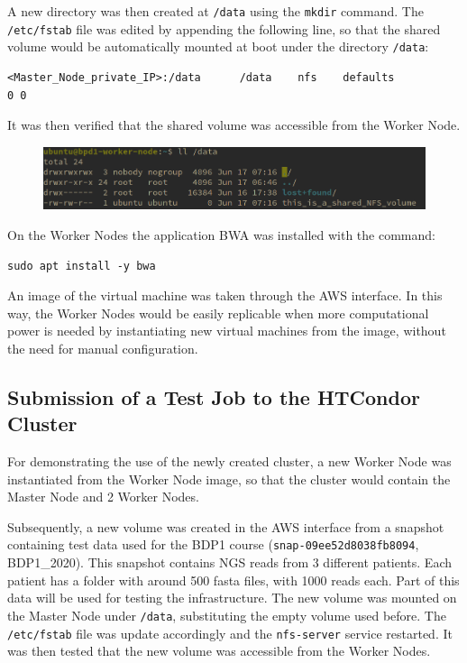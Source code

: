 \documentclass{article}
\begin{document}
A new directory was then created at \texttt{/data} using the \texttt{mkdir} command.
The \texttt{/etc/fstab} file was edited by appending the following line, so that the shared volume would be automatically mounted at boot under the directory \texttt{/data}:

\begin{lstlisting}
<Master_Node_private_IP>:/data      /data    nfs    defaults                0 0
\end{lstlisting}

It was then verified that the shared volume was accessible from the Worker Node.

\begin{figure}[!h]
    \center
    \includegraphics[width=\textwidth]{./images/nfs_works.png}
\end{figure}

On the Worker Nodes the application BWA was installed with the command:

\begin{lstlisting}
sudo apt install -y bwa
\end{lstlisting}

An image of the virtual machine was taken through the AWS interface.
In this way, the Worker Nodes would be easily replicable when more computational power is needed by instantiating new virtual machines from the image, without the need for manual configuration.

\subsection{Submission of a Test Job to the HTCondor Cluster}
For demonstrating the use of the newly created cluster, a new Worker Node was instantiated from the Worker Node image, so that the cluster would contain the Master Node and 2 Worker Nodes.

Subsequently, a new volume was created in the AWS interface from a snapshot containing test data used for the BDP1 course (\texttt{snap-09ee52d8038fb8094}, BDP1\_2020).
This snapshot contains NGS reads from 3 different patients.
Each patient has a folder with around 500 fasta files, with 1000 reads each.
Part of this data will be used for testing the infrastructure.
The new volume was mounted on the Master Node under \texttt{/data}, substituting the empty volume used before.
The \texttt{/etc/fstab} file was update accordingly and the \texttt{nfs-server} service restarted.
It was then tested that the new volume was accessible from the Worker Nodes.
\end{document}
